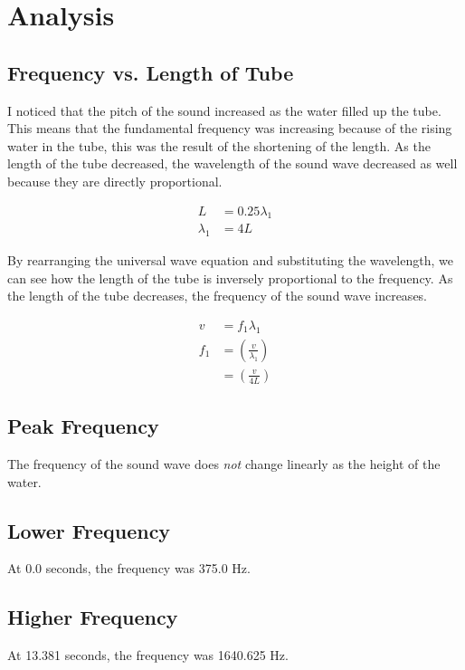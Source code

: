 \documentclass[12pt]{article}
\numberwithin{equation}{section}
\begin{document}
\section{Analysis}

\subsection{Frequency vs. Length of Tube}

I noticed that the pitch of the sound increased as the water filled up the tube. This means that the fundamental frequency was increasing because of the rising water in the tube, this was the result of the shortening of the length. As the length of the tube decreased, the wavelength of the sound wave decreased as well because they are directly proportional.

\begin{align}
L&=0.25\lambda_{1}\\
\lambda_{1}&=4L
\end{align}

By rearranging the universal wave equation and substituting the wavelength, we can see how the length of the tube is inversely proportional to the frequency. As the length of the tube decreases, the frequency of the sound wave increases.

\begin{align}
v&=f_{1}\lambda_{1}\\
f_{1}&=\left(\frac{v}{\lambda_{1}}\right)\\
&=\left(\frac{v}{4L}\right)
\end{align}

\subsection{Peak Frequency}

The frequency of the sound wave does \textit{not} change linearly as the height of the water.

\subsection{Lower Frequency}

At 0.0 seconds, the frequency was 375.0 Hz.

\subsection{Higher Frequency}

At 13.381 seconds, the frequency was 1640.625 Hz.
\end{document}
